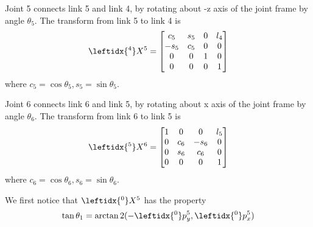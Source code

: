 \documentclass{article}
\begin{document}
Joint 5 connects link 5 and link 4, by rotating about -z axis of the joint frame by angle $\theta_5$. The transform from link 5 to link 4 is
\begin{align}
	\leftidx{^4}X^5 = \begin{bmatrix}
		c_5 & s_5 & 0 & l_4\\
		-s_5 & c_5 & 0 & 0\\
		0 & 0 & 1 & 0\\
		0 & 0 & 0 & 1
	\end{bmatrix}
\end{align}
where $c_5=\cos\theta_5,s_5=\sin\theta_5$.

Joint 6 connects link 6 and link 5, by rotating about x axis of the joint frame by angle $\theta_6$. The transform from link 6 to link 5 is
\begin{align}
	\leftidx{^5}X^6 = \begin{bmatrix}
		1 & 0 & 0 & l_5\\
		0 & c_6 & -s_6 & 0\\
		0 & s_6 & c_6 & 0\\
		0 & 0 & 0 & 1
	\end{bmatrix}
\end{align}
where $c_6=\cos\theta_6, s_6=\sin\theta_6$.

We first notice that $\leftidx{^0}X^5$ has the property
\begin{align}
	\tan\theta_1 = \arctan2(-\leftidx{^0}p^5_y, \leftidx{^0}p^5_x)
\end{align}
\end{document}
